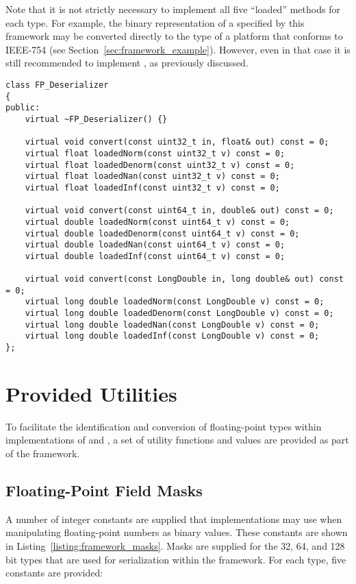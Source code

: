 Note that it is not strictly necessary to implement all five ``loaded'' methods for each type. For example, the binary representation of a  specified by this framework may be converted directly to the  type of a platform that conforms to IEEE-754 (see Section~\ref{sec:framework_example}). However, even in that case it is still recommended to implement , as previously discussed.

\noindent
\begin{minipage}{\linewidth}
\begin{singlespace}
\begin{lstlisting}[caption=The \code{FP\_Deserializer} interface., label=listing:framework_deserializer]
class FP_Deserializer
{
public:
    virtual ~FP_Deserializer() {}
    
    virtual void convert(const uint32_t in, float& out) const = 0;
    virtual float loadedNorm(const uint32_t v) const = 0;
    virtual float loadedDenorm(const uint32_t v) const = 0;
    virtual float loadedNan(const uint32_t v) const = 0;
    virtual float loadedInf(const uint32_t v) const = 0;
    
    virtual void convert(const uint64_t in, double& out) const = 0;
    virtual double loadedNorm(const uint64_t v) const = 0;
    virtual double loadedDenorm(const uint64_t v) const = 0;
    virtual double loadedNan(const uint64_t v) const = 0;
    virtual double loadedInf(const uint64_t v) const = 0;

    virtual void convert(const LongDouble in, long double& out) const = 0;
    virtual long double loadedNorm(const LongDouble v) const = 0;
    virtual long double loadedDenorm(const LongDouble v) const = 0;
    virtual long double loadedNan(const LongDouble v) const = 0;
    virtual long double loadedInf(const LongDouble v) const = 0;
};
\end{lstlisting}
\end{singlespace}
\end{minipage}

\section{Provided Utilities}
\label{sec:framework_utilities}
To facilitate the identification and conversion of floating-point types within implementations of  and , a set of utility functions and values are provided as part of the framework.

\subsection{Floating-Point Field Masks}
A number of integer constants are supplied that implementations may use when manipulating floating-point numbers as binary values. These constants are shown in Listing~\ref{listing:framework_masks}. Masks are supplied for the 32, 64, and 128 bit types that are used for serialization within the framework. For each type, five constants are provided:

